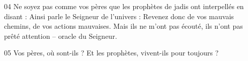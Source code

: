 
04 Ne soyez pas comme vos pères que les prophètes de jadis ont interpellés en disant : Ainsi parle le Seigneur de l’univers : Revenez donc de vos mauvais chemins, de vos actions mauvaises. Mais ils ne m’ont pas écouté, ils n’ont pas prêté attention – oracle du Seigneur.

05 Vos pères, où sont-ils ? Et les prophètes, vivent-ils pour toujours ?
